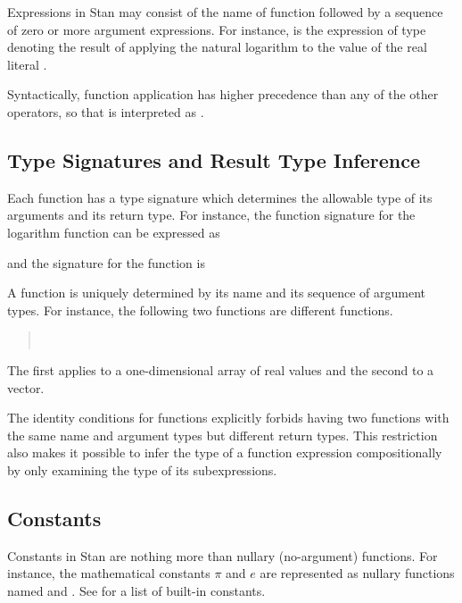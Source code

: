 Expressions in Stan may consist of the name of function followed by a
sequence of zero or more argument expressions.  For instance,
 is the expression of type  denoting the
result of applying the natural logarithm to the value of the real
literal .

Syntactically, function application has higher precedence than any of
the other operators, so that  is interpreted as
.

\subsection{Type Signatures and Result Type Inference}

Each function has a type signature which determines the allowable type
of its arguments and its return type.  For instance, the function
signature for the logarithm function can be expressed as
%
\begin{quote}
\end{quote}
%
and the signature for the  function is
%
\begin{quote}
\end{quote}
%
A function is uniquely determined by its name and its sequence of
argument types.  For instance, the following two functions are
different functions.
%
\begin{quote}
\\
\end{quote}
%
The first applies to a one-dimensional array of real values and the
second to a vector.

The identity conditions for functions explicitly forbids having two
functions with the same name and argument types but different return
types.  This restriction also makes it possible to infer the type of a
function expression compositionally by only examining the type of its
subexpressions.

\subsection{Constants}

Constants in Stan are nothing more than nullary (no-argument)
functions.  For instance, the mathematical constants $\pi$ and $e$ are
represented as nullary functions named  and .
See  for a list of built-in constants.


